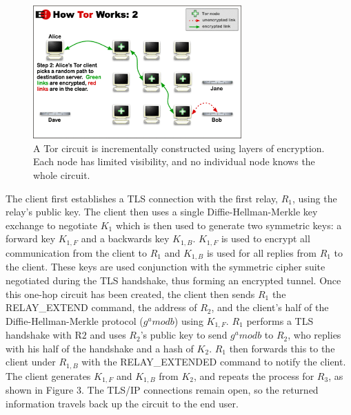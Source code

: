 \documentclass[journal]{IEEEtran}
\begin{document}
\begin{figure}[htbp]
\centering
\begin{minipage}{8 cm}
    \includegraphics[width=80mm]{resources/circuit-building-2.png}
    \caption{A Tor circuit is incrementally constructed using layers of encryption. Each node has limited visibility, and no individual node knows the whole circuit.}
\end{minipage}
\end{figure}

The client first establishes a TLS connection with the first relay, $R_{1}$, using the relay's public key. The client then uses a single Diffie-Hellman-Merkle key exchange to negotiate $K_{1}$ which is then used to generate two symmetric keys: a forward key $K_{1,F}$ and a backwards key $K_{1,B}$. $K_{1,F}$ is used to encrypt all communication from the client to $R_{1}$ and $K_{1,B}$ is used for all replies from $R_{1}$ to the client. These keys are used conjunction with the symmetric cipher suite negotiated during the TLS handshake, thus forming an encrypted tunnel. Once this one-hop circuit has been created, the client then sends $R_{1}$ the RELAY\_EXTEND command, the address of $R_{2}$, and the client's half of the Diffie-Hellman-Merkle protocol ($ g^a mod b $) using $K_{1,F}$. $R_{1}$ performs a TLS handshake with R${2}$ and uses $R_{2}$'s public key to send $ g^a mod b $ to $R_{2}$, who replies with his half of the handshake and a hash of $K_{2}$. $R_{1}$ then forwards this to the client under $R_{1,B}$ with the RELAY\_EXTENDED command to notify the client. The client generates $K_{1,F}$ and $K_{1,B}$ from $K_{2}$, and repeats the process for $R_{3}$,\cite{Ling2012} as shown in Figure 3. The TLS/IP connections remain open, so the returned information travels back up the circuit to the end user.
\end{document}
